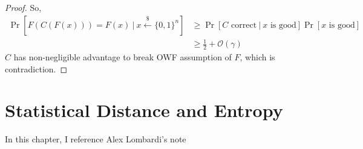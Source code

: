 \documentclass[12pt, a4paper, openany, twoside]{book}
\theoremstyle{definition}
\theoremstyle{remark}
\newcommand{\CO}{{\mathcal {O}}} \newcommand{\CP}{{\mathcal {P}}}
\theoremstyle{plain}
\numberwithin{equation}{section}
\begin{document}
\begin{proof}
So, 
\begin{align*}
    \Pr[F(C(F(x))) = F(x)~|~ x \xleftarrow{\$} \{0,1\}^n] & \geq \Pr[C \text{ correct}~|~ x \text{ is good}]\Pr[x \text{ is good}] \\
    & \geq \frac{1}{2} + \CO(\gamma)
\end{align*}
$C$ has non-negligible advantage to break OWF assumption of $F$, which is contradiction. 

\end{proof}

\chapter{Statistical Distance and Entropy}

In this chapter, I reference Alex Lombardi's note\cite{lombardi_crypto}


 
\end{document}
